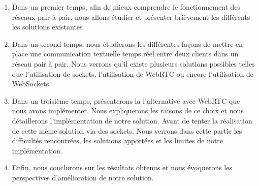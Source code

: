 \begin{enumerate}
\item Dans un premier temps, afin de mieux comprendre le fonctionnement des réseaux pair à pair, nous allons étudier et présenter brièvement les différents les solutions existantes

\item Dans un second temps, nous étudierons les différentes façons de mettre en place une communication textuelle temps réel entre deux clients dans un réseau pair à pair. Nous verrons
qu'il existe plusieurs solutions possibles telles que l'utilisation de sockets, l'utilisation de WebRTC ou encore l'utilisation de WebSockets.

\item Dans un troisième temps, présenterons la l'alternative avec WebRTC que nous avons implémenter. Nous expliquerons les raisons de ce choix et nous détaillerons l'implémentation de
notre solution. Avant de tenter la réalisation de cette même solution via des sockets. Nous verrons dans cette partie les difficultés rencontrées, les solutions apportées et les
limites de notre implémentation. 

\item Enfin, nous conclurons sur les résultats obtenus et nous évoquerons les perspectives d'amélioration de notre solution.

\end{enumerate}